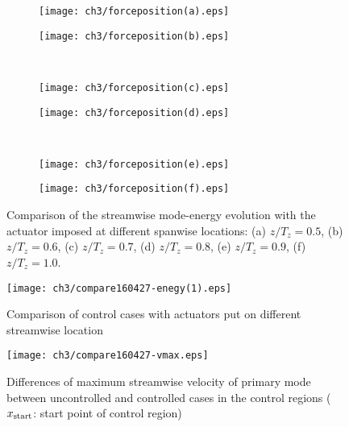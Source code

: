 \begin{figure}[H]
    \centering
    \begin{subfigure}{0.45\textwidth}           %
        \texttt{[image: ch3/forceposition(a).eps]}
        \caption{}\label{f:a1}
    \end{subfigure}
    \begin{subfigure}{0.45\textwidth}
        \texttt{[image: ch3/forceposition(b).eps]}
        \caption{}\label{f:b1}
    \end{subfigure}
    \\ \bigskip
    \begin{subfigure}{0.45\textwidth}         %
        \texttt{[image: ch3/forceposition(c).eps]}
        \caption{}\label{f:c1}
    \end{subfigure}
    \begin{subfigure}{0.45\textwidth}          %
        \texttt{[image: ch3/forceposition(d).eps]}
        \caption{}\label{f:d1}
    \end{subfigure}
    \\ \bigskip
    \begin{subfigure}{0.45\textwidth}          %
        \texttt{[image: ch3/forceposition(e).eps]}
        \caption{}\label{f:e1}
    \end{subfigure}
    \begin{subfigure}{0.45\textwidth}          %
        \texttt{[image: ch3/forceposition(f).eps]}
        \caption{}\label{f:f1}
    \end{subfigure}
    \caption{Comparison of the streamwise mode-energy evolution with the actuator imposed at different spanwise locations: (a) $z/T_z = 0.5$, (b) $z/T_z = 0.6$, (c) $z/T_z = 0.7$, (d) $z/T_z = 0.8$, (e) $z/T_z = 0.9$, (f) $z/T_z = 1.0$.}
    \label{f:spanwiselocations} %
\end{figure}
\begin{figure}[htb]
  \centering
  \texttt{[image: ch3/compare160427-enegy(1).eps]}\\
  \caption{Comparison of control cases with actuators put on different streamwise location}\label{f:streamforce}
\end{figure}
\begin{figure}
  \centering
  \texttt{[image: ch3/compare160427-vmax.eps]}\\
  \caption{Differences of maximum streamwise velocity of primary mode between uncontrolled and controlled cases in the control regions ($x_{\rm start}$: start point of control region)}\label{f:streamforce2}
\end{figure}

